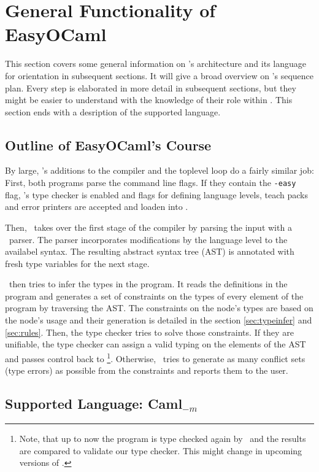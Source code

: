 
\section{General Functionality of EasyOCaml}
\label{sec:general}

This section covers some general information on \easyocaml's architecture and
its language for orientation in subsequent sections.
It will give a broad overview on \easyocaml's sequence plan.
Every step is elaborated in more detail in subsequent sections, but they might
be easier to understand with the knowledge of their role within \easyocaml.
This section ends with a desription of the supported language.

\subsection{Outline of EasyOCaml's Course}

By large, \easyocaml's additions to the compiler and the toplevel loop do a
fairly similar job: First, both programs parse the command line flags. If they
contain the \texttt{-easy} flag, \easyocaml's type checker is enabled and flags
for defining language levels, teach packs and error printers are accepted and
loaden into \easyocaml.

Then, \easyocaml\ takes over the first stage of the compiler by parsing the
input with a \camlpf\ parser. The parser incorporates modifications by the
language level to the availabel syntax. The resulting abstract syntax tree (AST)
is annotated with fresh type variables for the next stage.

\easyocaml\ then tries to infer the types in the program. It reads the definitions in
the program and generates a set of constraints on the types of every element of
the program by traversing the AST. The constraints on the node's types are based
on the node's usage and their generation is detailed in the section
\ref{sec:typeinfer} and \ref{sec:rules}.
Then, the type checker tries to solve those constraints. If they are unifiable,
the type checker can assign a valid typing on the elements of the AST and passes
control back to \ocaml\footnote{Note, that up to now the program is type checked
again by \ocaml\ and the results are compared to validate our type checker. This
might change in upcoming versions of \easyocaml.}.
Otherwise, \easyocaml\ tries to generate as many conflict sets (type errors) as
possible from the constraints and reports them to the user.

\subsection{Supported Language: Caml$_{-m}$}
\label{sec:language}

